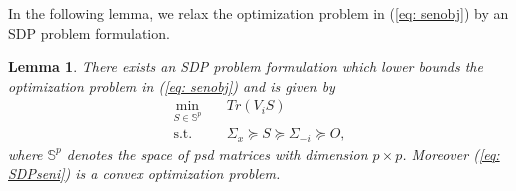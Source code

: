 \documentclass[12pt,journal,onecolumn]{IEEEtran}
\newtheorem{lemma}{Lemma}
\newenvironment{Proof}[1]{\medskip\par\noindent{\bf Proof:\,}\,#1}{{\mbox{\,$\blacksquare$}\par}}
\newcommand{\rknote}[1]{\noindent{\leavevmode\color{red}[Raj -- #1]}}
\begin{document}
In the following lemma, we relax the optimization problem in (\ref{eq: senobj}) by an SDP problem formulation. 
 \begin{lemma}\label{lem: bestresplbound}
 There exists an SDP problem formulation which lower bounds the optimization problem in (\ref{eq: senobj}) %
 and is given by
 \begin{align}
\min_{S\in\mathbb{S}^p} & \quad Tr(V_iS) \nonumber\\
\textrm{s.t.} & \quad 
\Sigma_x\succeq S\succeq \Sigma_{-i}\succeq O , \label{eq: SDPseni}
\end{align}
where $\mathbb{S}^p$ denotes the space of psd matrices with dimension $p\times p$. Moreover (\ref{eq: SDPseni}) is a convex optimization problem.  
 \end{lemma}
\end{document}
